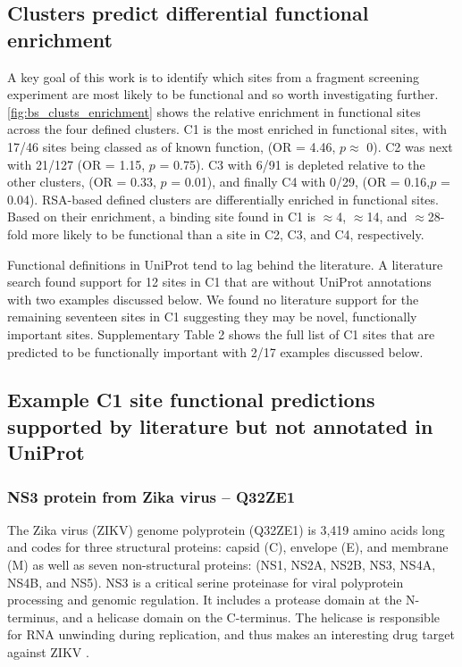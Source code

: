 \subsection{Clusters predict differential functional enrichment}

A key goal of this work is to identify which sites from a fragment screening experiment are most likely to be functional and so worth investigating further. \autoref{fig:bs_clusts_enrichment} shows the relative enrichment in functional sites across the four defined clusters. C1 is the most enriched in functional sites, with 17/46 sites being classed as of known function, (OR = 4.46, $p \approx$ 0). C2 was next with 21/127 (OR = 1.15, $p$ = 0.75). C3 with 6/91 is depleted relative to the other clusters, (OR = 0.33, $p$ = 0.01), and finally C4 with 0/29, (OR = 0.16,$p$ = 0.04). RSA-based defined clusters are differentially enriched in functional sites. Based on their enrichment, a binding site found in C1 is $\approx$4, $\approx$14, and $\approx$28-fold more likely to be functional than a site in C2, C3, and C4, respectively.

Functional definitions in UniProt tend to lag behind the literature. A literature search found support for 12 sites in C1 that are without UniProt annotations with two examples discussed below. We found no literature support for the remaining seventeen sites in C1 suggesting they may be novel, functionally important sites.  Supplementary Table 2 shows the full list of C1 sites that are predicted to be functionally important with 2/17 examples discussed below.

\subsection{Example C1 site functional predictions supported by literature but not annotated in UniProt}

\subsubsection{NS3 protein from Zika virus -- Q32ZE1}

The Zika virus (ZIKV) genome polyprotein (Q32ZE1) is 3,419 amino acids long and codes for three structural proteins: capsid (C), envelope (E), and membrane (M) as well as seven non-structural proteins: (NS1, NS2A, NS2B, NS3, NS4A, NS4B, and NS5). NS3 is a critical serine proteinase for viral polyprotein processing and genomic regulation. It includes a protease domain at the N-terminus, and a helicase domain on the C-terminus. The helicase is responsible for RNA unwinding during replication, and thus makes an interesting drug target against ZIKV \cite{LUO_2015_FLAVIVIRUS}.


